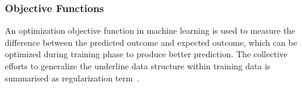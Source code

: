 \subsubsection{Objective Functions}
An optimization objective function in machine learning is used to measure the difference between the predicted outcome and expected outcome, which can be optimized during training phase to produce  better prediction. The collective efforts to generalize the underline data structure within training data is summarised as regularization term~\cite{goodfellow_2015}.  